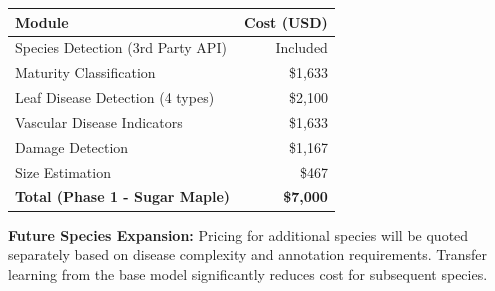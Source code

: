 \documentclass[11pt,a4paper]{article}
\begin{document}
\begin{center}
\renewcommand{\arraystretch}{1.4}
\begin{tabular}{|l|r|}
\hline
\rowcolor{primary!20}
\textbf{Module} & \textbf{Cost (USD)} \\
\hline
Species Detection (3rd Party API) & Included \\
\hline
Maturity Classification & \$1,633 \\
\hline
Leaf Disease Detection (4 types) & \$2,100 \\
\hline
Vascular Disease Indicators & \$1,633 \\
\hline
Damage Detection & \$1,167 \\
\hline
Size Estimation & \$467 \\
\hline
\rowcolor{accent!20}
\textbf{Total (Phase 1 - Sugar Maple)} & \textbf{\$7,000} \\
\hline
\end{tabular}
\end{center}

\vspace{0.3cm}
\begin{center}
\end{center}
\vspace{0.3cm}

\begin{center}
\end{center}

\vspace{0.5cm}

\textbf{Future Species Expansion:} Pricing for additional species will be quoted separately based on disease complexity and annotation requirements. Transfer learning from the base model significantly reduces cost for subsequent species.
\end{document}
